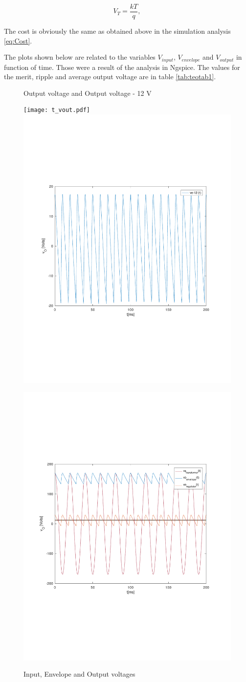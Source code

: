 \begin{equation}
    V_{T} = \frac{kT}{q},
    \label{eq:Ac3}
\end{equation}

The cost is obviously the same as obtained above in the simulation analysis \ref{eq:Cost}.

The plots shown below are related to the variables $V_{input}$, $V_{envelope}$ and $V_{output}$ in function of time. Those were a result of the analysis in Ngspice. The values for the merit, ripple and average output voltage are in table \ref{tab:teotab1}.


\begin{figure}[!ht] \centering
\caption{Output voltage and Output voltage - 12 V}
\squeezeup 
\squeezeup 
\squeezeup 
\squeezeup 
\squeezeup 
\texttt{[image: t\_vout.pdf]}
\includegraphics[width=0.45\linewidth]{deviation.pdf}
\squeezeup 
\squeezeup 
\squeezeup 
\squeezeup 
\caption{Input, Envelope and Output voltages}
\squeezeup 
\squeezeup 
\squeezeup 
\squeezeup 
\squeezeup 
\squeezeup 
\squeezeup 
\includegraphics[width=0.7\linewidth]{all_vout.pdf}
\label{fig:simulation_5}
\end{figure}

